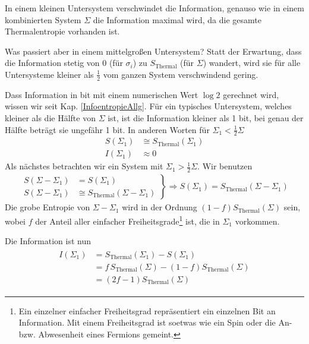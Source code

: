\documentclass[ngerman]{scrartcl}
\begin{document}
In einem kleinen Untersystem verschwindet die Information, genauso wie in einem kombinierten System $\Sigma$ die Information maximal wird, da die gesamte Thermalentropie vorhanden ist.

Was passiert aber in einem mittelgroßen Untersystem? Statt der Erwartung, dass die Information stetig von 0 (für $\sigma_i$) zu $S_{\text{Thermal}}$ (für $\Sigma$) wandert, wird sie für alle Untersysteme kleiner als $\frac{1}{2}$ vom ganzen System verschwindend gering. 

Dass Information in bit mit einem numerischen Wert $\log 2$ gerechnet wird, wissen wir seit Kap. \ref{InfoentropieAllg}. Für ein typisches Untersystem, welches kleiner als die Hälfte von $\Sigma$ ist, ist die Information kleiner als 1 bit, bei genau der Hälfte beträgt sie ungefähr 1 bit. In anderen Worten für $\Sigma_1 < \frac{1}{2} \Sigma$ 
	\begin{align*}
		S(\Sigma_1) &\cong S_{\text{Thermal}}(\Sigma_1) \\
		I(\Sigma_1) &\approx 0
	\end{align*}
Als nächstes betrachten wir ein System mit $\Sigma_1 > \frac{1}{2} \Sigma$. Wir benutzen
	\begin{align}
		\left.
		\begin{aligned}
			S(\Sigma - \Sigma_1) &= S(\Sigma_1) \\
			S(\Sigma - \Sigma_1) &\cong S_{\text{Thermal}} (\Sigma - \Sigma_1)
		\end{aligned}
		\right\}
		\Rightarrow S(\Sigma_1) = S_{\text{Thermal}} (\Sigma - \Sigma_1)
	\end{align}
Die grobe Entropie von $\Sigma - \Sigma_1$ wird in der Ordnung $(1- f) S_{\text{Thermal}}(\Sigma)$ sein, wobei $f$ der Anteil aller einfacher Freiheitsgrade\footnote{Ein einzelner einfacher Freiheitsgrad repräsentiert ein einzelnen Bit an Information. Mit einem Freiheitsgrad ist soetwas wie ein Spin oder die An- bzw. Abwesenheit eines Fermions gemeint.} ist, die in $\Sigma_1$ vorkommen. 

Die Information ist nun
	\begin{align}
		\begin{aligned}
		I (\Sigma_1) &= S_{\text{Thermal}}(\Sigma_1) - S(\Sigma_1) \\
		&= f\, S_{\text{Thermal}} (\Sigma) - (1 - f)S_{\text{Thermal}}(\Sigma) \\
		&= (2f - 1) S_{\text{Thermal}}(\Sigma) 
		\end{aligned}
	\end{align}
\end{document}
